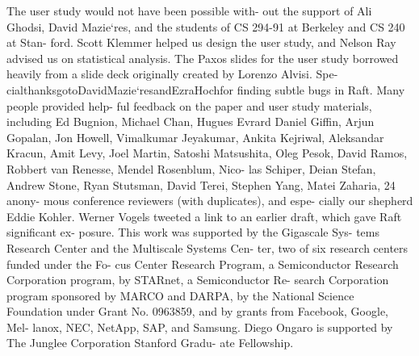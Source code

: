 \documentclass[journal]{IEEEtran}
\begin{document}
The user study would not have been possible with- out the support of Ali Ghodsi, David Mazie`res, and the students of CS 294-91 at Berkeley and CS 240 at Stan- ford. Scott Klemmer helped us design the user study, and Nelson Ray advised us on statistical analysis. The Paxos slides for the user study borrowed heavily from a slide deck originally created by Lorenzo Alvisi. Spe- cialthanksgotoDavidMazie`resandEzraHochfor finding subtle bugs in Raft. Many people provided help- ful feedback on the paper and user study materials, including Ed Bugnion, Michael Chan, Hugues Evrard Daniel Giffin, Arjun Gopalan, Jon Howell, Vimalkumar Jeyakumar, Ankita Kejriwal, Aleksandar Kracun, Amit Levy, Joel Martin, Satoshi Matsushita, Oleg Pesok, David Ramos, Robbert van Renesse, Mendel Rosenblum, Nico- las Schiper, Deian Stefan, Andrew Stone, Ryan Stutsman, David Terei, Stephen Yang, Matei Zaharia, 24 anony- mous conference reviewers (with duplicates), and espe- cially our shepherd Eddie Kohler. Werner Vogels tweeted a link to an earlier draft, which gave Raft significant ex- posure. This work was supported by the Gigascale Sys- tems Research Center and the Multiscale Systems Cen- ter, two of six research centers funded under the Fo- cus Center Research Program, a Semiconductor Research Corporation program, by STARnet, a Semiconductor Re- search Corporation program sponsored by MARCO and DARPA, by the National Science Foundation under Grant No. 0963859, and by grants from Facebook, Google, Mel- lanox, NEC, NetApp, SAP, and Samsung. Diego Ongaro is supported by The Junglee Corporation Stanford Gradu- ate Fellowship.



 



\end{document}

